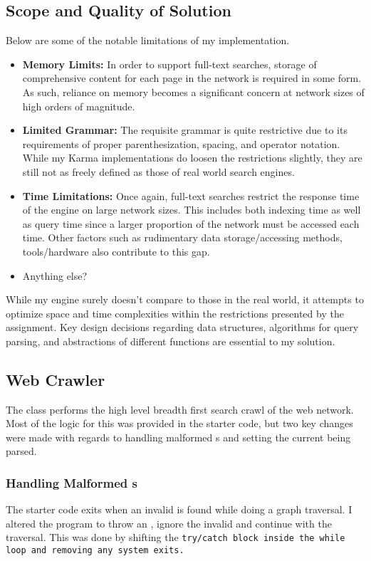 \documentclass[11pt]{article}
\begin{document}
\subsection{Scope and Quality of Solution}
Below are some of the notable limitations of my implementation.
\begin{itemize}
	\item \textbf{Memory Limits: } In order to support full-text searches, storage of comprehensive content for each page in the network is required in some form. As such, reliance on memory becomes a significant concern at network sizes of high orders of magnitude. 
	\item \textbf{Limited Grammar: } The requisite grammar is quite restrictive due to its requirements of proper parenthesization, spacing, and operator notation. While my Karma implementations do loosen the restrictions slightly, they are still not as freely defined as those of real world search engines. 
	\item \textbf{Time Limitations: } Once again, full-text searches restrict the response time of the engine on large network sizes. This includes both indexing time as well as query time since a larger proportion of the network must be accessed each time. Other factors such as rudimentary data storage/accessing methods, tools/hardware also contribute to this gap.
	\item Anything else?  
\end{itemize}
While my engine surely doesn't compare to those in the real world, it attempts to optimize space and time complexities within the restrictions presented by the assignment. Key design decisions regarding data structures, algorithms for query parsing, and abstractions of different functions are essential to my solution.



\subsection{Web Crawler}
The \WC{} class performs the high level breadth first search crawl of the web network. Most of the logic for this was provided in the starter code, but two key changes were made with regards to handling malformed \URL s and setting the current \Page{} being parsed.
\subsubsection{Handling Malformed \URL s}
The starter code exits when an invalid \URL{} is found while doing a graph traversal. I altered the program to throw an \MUE{}, ignore the invalid \URL{} and continue with the traversal. This was done by shifting the \tt{try/catch} block inside the while loop and removing any system exits.
\end{document}
